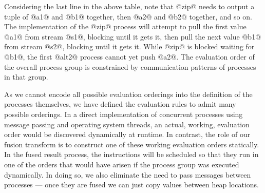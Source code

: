 Considering the last line in the above table, note that @zip@ needs to output a tuple of @a1@ and @b1@ together, then @a2@ and @b2@ together, and so on. The implementation of the @zip@ process will attempt to pull the first value @a1@ from stream @s1@, blocking until it gets it, then pull the next value @b1@ from stream @s2@, blocking until it gets it. While @zip@ is blocked waiting for @b1@, the first @alt2@ process cannot yet push @a2@. The evaluation order of the overall process group is constrained by communication patterns of processes in that group.

As we cannot encode all possible evaluation orderings into the definition of the processes themselves, we have defined the evaluation rules to admit many possible orderings. In a direct implementation of concurrent processes using message passing and operating system threads, an actual, working, evaluation order would be discovered dynamically at runtime. In contrast, the role of our fusion transform is to construct one of these working evaluation orders statically. In the fused result process, the instructions will be scheduled so that they run in one of the orders that would have arisen if the process group was executed dynamically. In doing so, we also eliminate the need to pass messages between processes --- once they are fused we can just copy values between heap locations.






